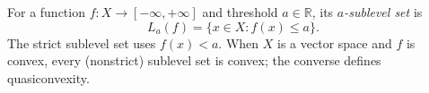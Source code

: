 
For a function $f:X\to[-\infty,+\infty]$ and threshold $a\in\mathbb R$, its \emph{$a$-sublevel set} is
\[
L_a(f)=\{x\in X:f(x)\le a\}.
\]
The strict sublevel set uses $f(x)<a$. When $X$ is a vector space and $f$ is convex, every (nonstrict) sublevel set is convex; the converse defines quasiconvexity.
